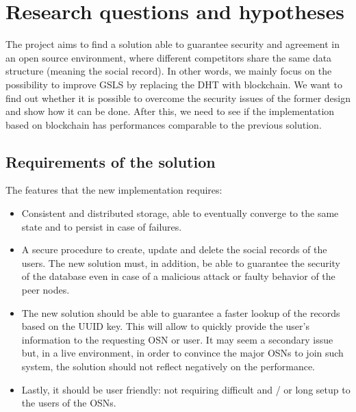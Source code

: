 \section{Research questions and hypotheses}
\label{S:3}

The project aims to find a solution able to guarantee security and agreement in an open source environment, where different competitors share the same data structure (meaning the social record). In other words, we mainly focus on the possibility to improve GSLS by replacing the DHT with blockchain. We want to find out whether it is possible to overcome the security issues of the former design and show how it can be done. After this, we need to see if the implementation based on blockchain has performances comparable to the previous solution. 

\subsection{Requirements of the solution}

The features that the new implementation requires:

\begin{itemize}
  \item Consistent and distributed storage, able to eventually converge to the same state and to persist in case of failures.
  \item A secure procedure to create, update and delete the social records of the users. The new solution must, in addition, be able to guarantee the security of the database even in case of a malicious attack or faulty behavior of the peer nodes.
  \item The new solution should be able to guarantee a faster lookup of the records based on the UUID key. This will allow to quickly provide the user's information to the requesting OSN or user. It may seem a secondary issue but, in a live environment, in order to convince the major OSNs to join such system, the solution should not reflect negatively on the performance.
  \item Lastly, it should be user friendly: not requiring difficult and / or long setup to the users of the OSNs.
\end{itemize}



